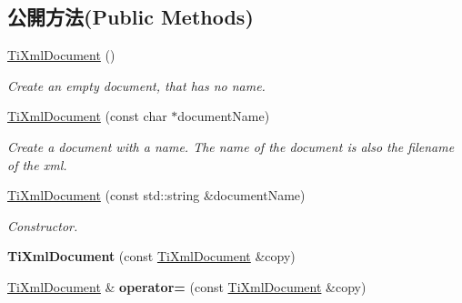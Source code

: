 \subsection*{公開方法(Public Methods)}
\begin{DoxyCompactItemize}
\item 
\hyperlink{class_ti_xml_document_a9f5e84335708fde98400230f9f12659c}{Ti\+Xml\+Document} ()\hypertarget{class_ti_xml_document_a9f5e84335708fde98400230f9f12659c}{}\label{class_ti_xml_document_a9f5e84335708fde98400230f9f12659c}

\begin{DoxyCompactList}\small\item\em Create an empty document, that has no name. \end{DoxyCompactList}\item 
\hyperlink{class_ti_xml_document_ae4508b452d0c3061db085f3db27b8396}{Ti\+Xml\+Document} (const char $\ast$document\+Name)\hypertarget{class_ti_xml_document_ae4508b452d0c3061db085f3db27b8396}{}\label{class_ti_xml_document_ae4508b452d0c3061db085f3db27b8396}

\begin{DoxyCompactList}\small\item\em Create a document with a name. The name of the document is also the filename of the xml. \end{DoxyCompactList}\item 
\hyperlink{class_ti_xml_document_a2c6e58fb99bfa76cc613f16840022225}{Ti\+Xml\+Document} (const std\+::string \&document\+Name)\hypertarget{class_ti_xml_document_a2c6e58fb99bfa76cc613f16840022225}{}\label{class_ti_xml_document_a2c6e58fb99bfa76cc613f16840022225}

\begin{DoxyCompactList}\small\item\em Constructor. \end{DoxyCompactList}\item 
{\bfseries Ti\+Xml\+Document} (const \hyperlink{class_ti_xml_document}{Ti\+Xml\+Document} \&copy)\hypertarget{class_ti_xml_document_a323a7486e7da6099cdc19a5ff7e74b07}{}\label{class_ti_xml_document_a323a7486e7da6099cdc19a5ff7e74b07}

\item 
\hyperlink{class_ti_xml_document}{Ti\+Xml\+Document} \& {\bfseries operator=} (const \hyperlink{class_ti_xml_document}{Ti\+Xml\+Document} \&copy)\hypertarget{class_ti_xml_document_aa56fd4dbe8917d2033d865909e2d737e}{}\label{class_ti_xml_document_aa56fd4dbe8917d2033d865909e2d737e}


\end{DoxyCompactItemize}
